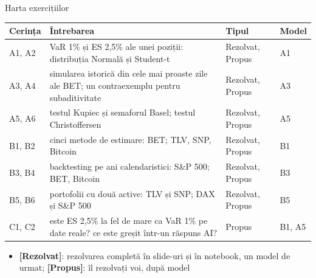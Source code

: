 \begin{frame}{Harta exercițiilor}
\itemsize{\small}
\begin{center}
\footnotesize
\begin{tabular}{>{\raggedright\arraybackslash}p{1.1cm}>{\raggedright\arraybackslash}p{7.5cm}>{\raggedright\arraybackslash}p{1.9cm}>{\raggedright\arraybackslash}p{1.4cm}}
\toprule
\textbf{Cerința} & \textbf{Întrebarea} & \textbf{Tipul} & \textbf{Model} \\
\midrule
A1, A2 & VaR 1\% și ES 2,5\% ale unei poziții: distribuția Normală și Student-t & Rezolvat, Propus & A1 \\
A3, A4 & simularea istorică din cele mai proaste zile ale BET; un contraexemplu pentru subaditivitate & Rezolvat, Propus & A3 \\
A5, A6 & testul Kupiec și semaforul Basel; testul Christoffersen & Rezolvat, Propus & A5 \\
B1, B2 & cinci metode de estimare: BET; TLV, SNP, Bitcoin & Rezolvat, Propus & B1 \\
B3, B4 & backtesting pe ani calendaristici: S\&P 500; BET, Bitcoin & Rezolvat, Propus & B3 \\
B5, B6 & portofolii cu două active: TLV și SNP; DAX și S\&P 500 & Rezolvat, Propus & B5 \\
C1, C2 & este ES 2,5\% la fel de mare ca VaR 1\% pe date reale? ce este greșit într-un răspuns AI? & Propus & B1, A5 \\
\bottomrule
\end{tabular}
\end{center}
\begin{itemize}
    \item \textbf{[Rezolvat]}: rezolvarea completă în slide-uri și în notebook, un model de urmat; \textbf{[Propus]}: îl rezolvați voi, după model
\end{itemize}
\end{frame}

